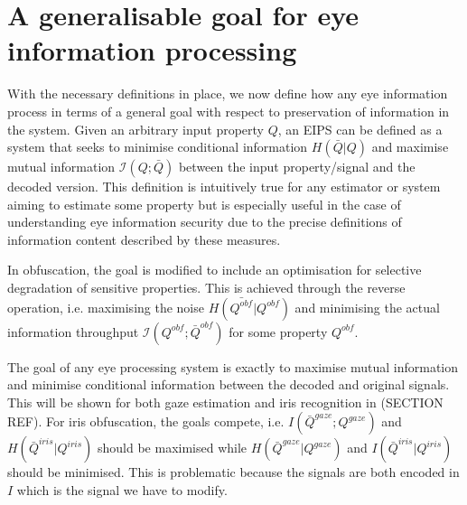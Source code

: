 

\section{A generalisable goal for eye information processing}
With the necessary definitions in place, we now define how any eye information process in terms of a general goal with respect to preservation of information in the system. Given an arbitrary input property $Q$, an EIPS can be defined as a system that seeks to minimise conditional information $H(\bar{Q}|Q)$ and maximise mutual information $\mathcal{I}(Q;\bar{Q})$ between the input property/signal and the decoded version. This definition is intuitively true for any estimator or system aiming to estimate some property but is especially useful in the case of understanding eye information security due to the precise definitions of information content described by these measures.

In obfuscation, the goal is modified to include an optimisation for selective degradation of sensitive properties. This is achieved through the reverse operation, i.e. maximising the noise $H(\bar{Q^{obf}}|Q^{obf})$ and minimising the actual information throughput $\mathcal{I}(Q^{obf};\bar{Q}^{obf})$ for some property $Q^{obf}$. 

The goal of any eye processing system is exactly to maximise mutual information and minimise conditional information between the decoded and original signals. This will be shown for both gaze estimation and iris recognition in (SECTION REF). For iris obfuscation, the goals compete, i.e. $I(\bar{Q}^{gaze};Q^{gaze})$ and $H(\bar{Q}^{iris}|Q^{iris})$ should be maximised while $H(\bar{Q}^{gaze}|Q^{gaze})$ and $I(\bar{Q}^{iris}|Q^{iris})$ should be minimised. This is problematic because the signals are both encoded in $I$ which is the signal we have to modify. 


